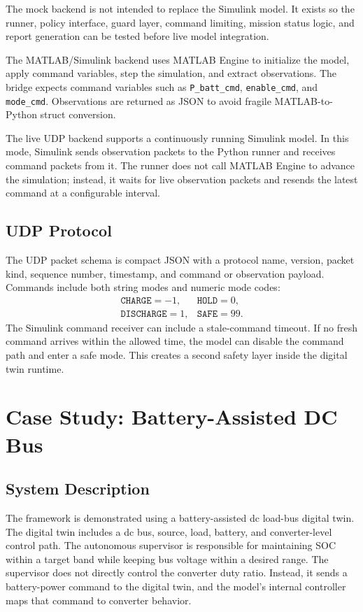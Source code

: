 \documentclass[conference]{IEEEtran}
\begin{document}
The mock backend is not intended to replace the Simulink model. It exists so
the runner, policy interface, guard layer, command limiting, mission status
logic, and report generation can be tested before live model integration.

The MATLAB/Simulink backend uses MATLAB Engine to initialize the model, apply
command variables, step the simulation, and extract observations. The bridge
expects command variables such as \texttt{P\_batt\_cmd}, \texttt{enable\_cmd},
and \texttt{mode\_cmd}. Observations are returned as JSON to avoid fragile
MATLAB-to-Python struct conversion.

The live UDP backend supports a continuously running Simulink model. In this
mode, Simulink sends observation packets to the Python runner and receives
command packets from it. The runner does not call MATLAB Engine to advance the
simulation; instead, it waits for live observation packets and resends the
latest command at a configurable interval.

\subsection{UDP Protocol}

The UDP packet schema is compact JSON with a protocol name, version, packet
kind, sequence number, timestamp, and command or observation payload. Commands
include both string modes and numeric mode codes:
\begin{equation}
\begin{array}{ll}
\texttt{CHARGE}=-1, & \texttt{HOLD}=0,\\
\texttt{DISCHARGE}=1, & \texttt{SAFE}=99.
\end{array}
\end{equation}
The Simulink command receiver can include a stale-command timeout. If no fresh
command arrives within the allowed time, the model can disable the command
path and enter a safe mode. This creates a second safety layer inside the
digital twin runtime.

\section{Case Study: Battery-Assisted DC Bus}

\subsection{System Description}

The framework is demonstrated using a battery-assisted dc load-bus digital
twin. The digital twin includes a dc bus, source, load, battery, and
converter-level control path. The autonomous supervisor is responsible for
maintaining SOC within a target band while keeping bus voltage within a
desired range. The supervisor does not directly control the converter duty
ratio. Instead, it sends a battery-power command to the digital twin, and the
model's internal controller maps that command to converter behavior.
\end{document}
